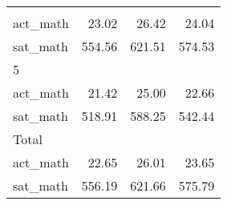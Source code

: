 \begin{table}[!h]
\begin{tabular}{llll}
  \multicolumn{1}{r}{} \\
\multicolumn{1}{l}{\hspace{2em}act\_math} &
  \multicolumn{1}{|r}{23.02} &
  \multicolumn{1}{r}{26.42} &
  \multicolumn{1}{r}{24.04} \\
\multicolumn{1}{l}{\hspace{2em}sat\_math} &
  \multicolumn{1}{|r}{554.56} &
  \multicolumn{1}{r}{621.51} &
  \multicolumn{1}{r}{574.53} \\
\multicolumn{1}{l}{\hspace{1em}5} &
  \multicolumn{1}{|r}{} &
  \multicolumn{1}{r}{} &
  \multicolumn{1}{r}{} \\
\multicolumn{1}{l}{\hspace{2em}act\_math} &
  \multicolumn{1}{|r}{21.42} &
  \multicolumn{1}{r}{25.00} &
  \multicolumn{1}{r}{22.66} \\
\multicolumn{1}{l}{\hspace{2em}sat\_math} &
  \multicolumn{1}{|r}{518.91} &
  \multicolumn{1}{r}{588.25} &
  \multicolumn{1}{r}{542.44} \\
\multicolumn{1}{l}{\hspace{1em}Total} &
  \multicolumn{1}{|r}{} &
  \multicolumn{1}{r}{} &
  \multicolumn{1}{r}{} \\
\multicolumn{1}{l}{\hspace{2em}act\_math} &
  \multicolumn{1}{|r}{22.65} &
  \multicolumn{1}{r}{26.01} &
  \multicolumn{1}{r}{23.65} \\
\multicolumn{1}{l}{\hspace{2em}sat\_math} &
  \multicolumn{1}{|r}{556.19} &
  \multicolumn{1}{r}{621.66} &
  \multicolumn{1}{r}{575.79} \\
\cline{1-4}
\end{tabular}
\end{table}

